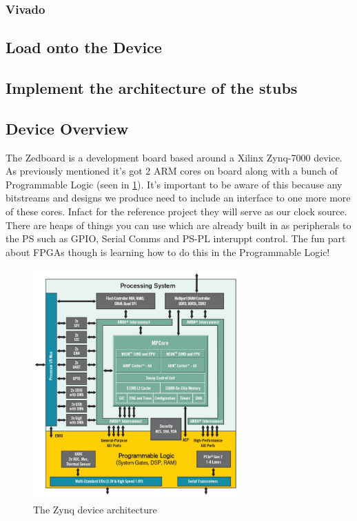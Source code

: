 \subsubsection{Vivado}

\subsection{Load onto the Device}

\subsection{Implement the architecture of the stubs}

\subsection{Device Overview}
The Zedboard is a development board based around a Xilinx Zynq-7000 device. As previously mentioned it's got 2 ARM cores on board along with a bunch of Programmable Logic (seen in \cref{fig:zynq}). It's important to be aware of this because any bitstreams and designs we produce need to include an interface to one more more of these cores. Infact for the reference project they will serve as our clock source. There are heaps of things you can use which are already built in as peripherals to the PS such as GPIO, Serial Comms and PS-PL interuppt control. The fun part about FPGAs though is learning how to do this in the Programmable Logic!

\begin{figure}[H]
    \begin{center}
        \includegraphics[width=0.7\textwidth]{./src/zynq_arch.jpg}
        \caption{The Zynq device architecture}
        \label{fig:zynq}
    \end{center}
\end{figure}

